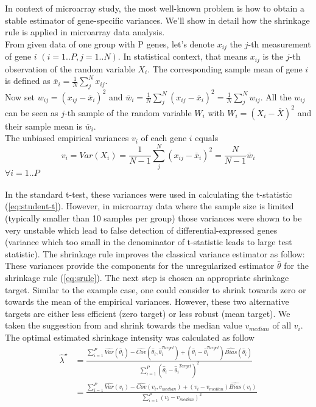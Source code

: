 In context of microarray study, the most well-known problem is how to obtain a stable estimator of gene-specific variances. We'll show in detail how the shrinkage rule is applied in microarray data analysis.\\
From given data of one group with P genes, let's denote $x_{ij}$ the $j$-th measurement of gene $i$ $(i = 1..P, j = 1..N)$. In statistical context, that means $x_{ij}$ is the $j$-th observation of the random variable $X_i$. The corresponding sample mean of gene $i$ is defined as $\overline{x}_i = \frac{1}{N}\sum^N_j{x_{ij}}$. \\
Now set $w_{ij} = (x_{ij} - \overline{x}_i)^2$ and $\overline{w}_i = \frac{1}{N}\sum^N_j{(x_{ij} - \overline{x}_i)^2} = \frac{1}{N}\sum^N_j{w_{ij}}$. All the $w_{ij}$ can be seen as $j$-th sample of the random variable $W_i$ with $W_i = (X_i - \overline{X})^2$ and their sample mean is $\overline{w}_i$.\\
The unbiased empirical variances $v_i$ of each gene $i$ equals
\begin{equation}
	v_i = Var(X_i) = \frac{1}{N-1}\sum^N_j{(x_{ij} - \overline{x}_i)^2} = \frac{N}{N-1}\overline{w}_i
\end{equation}
$\forall i = 1..P$\\ \\
In the standard t-test, these variances were used in calculating the t-statistic (\autoref{eq:student-t}). However, in microarray data where the sample size is limited (typically smaller than 10 samples per group) those variances were shown to be very unstable which lead to false detection of differential-expressed genes (variance which too small in the denominator of t-statistic leads to large test statistic). The shrinkage rule improves the classical variance estimator as follow:\\
These variances provide the components for the unregularized estimator $\hat \theta$ for the shrinkage rule (\autoref{eq:srule}). The next step is chosen an appropriate shrinkage target. Similar to the example case, one could consider to shrink towards zero or towards the mean of the empirical variances. However, these two alternative targets are either less efficient (zero target) or less robust (mean target). We taken the suggestion from \cite{OpgenRhein:2007p11} and shrink towards the median value $v_{median}$ of all $v_i$.\\
The optimal estimated shrinkage intensity was calculated as follow
\begin{align*}
	\hat \lambda^\star &= \frac{\sum^P_{i=1}\widehat{Var}(\hat \theta_i) - \widehat{Cov}(\hat \theta_i, \hat \theta_i^{Target}) + (\hat \theta_i - \hat \theta_i^{Target})\widehat{Bias}(\hat \theta_i)}{\sum^P_{i=1}(\hat \theta_i - {\hat \theta_i}^{Target})^2} \\
	&= \frac{\sum^P_{i=1}\widehat{Var}(v_i) - \widehat{Cov}(v_i, v_{median}) + (v_i - v_{median})\widehat{Bias}(v_i)}{\sum^P_{i=1}(v_i - v_{median})^2}
\end{align*}
